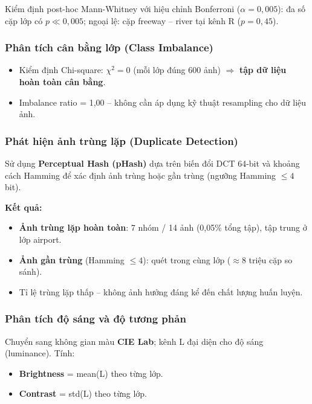 \documentclass[12pt,a4paper]{article}
\let\oldtextbf\textbf
\renewcommand{\textbf}[1]{\oldtextbf{\textcolor{hcmublue}{#1}}}
\begin{document}
Kiểm định post-hoc Mann-Whitney với hiệu chỉnh Bonferroni ($\alpha = 0{,}005$): đa số cặp lớp có $p \ll 0{,}005$; ngoại lệ: cặp freeway -- river tại kênh R ($p = 0{,}45$).

\subsubsection{Phân tích cân bằng lớp (Class Imbalance)}

\begin{itemize}
    \item Kiểm định Chi-square: $\chi^2 = 0$ (mỗi lớp đúng 600 ảnh) $\Rightarrow$ \textbf{tập dữ liệu hoàn toàn cân bằng}.
    \item Imbalance ratio = 1,00 -- không cần áp dụng kỹ thuật resampling cho dữ liệu ảnh.
\end{itemize}

\subsubsection{Phát hiện ảnh trùng lặp (Duplicate Detection)}

Sử dụng \textbf{Perceptual Hash (pHash)} dựa trên biến đổi DCT 64-bit và khoảng cách Hamming để xác định ảnh trùng hoặc gần trùng (ngưỡng Hamming $\leq 4$ bit).

\textbf{Kết quả:}
\begin{itemize}
    \item \textbf{Ảnh trùng lặp hoàn toàn}: 7 nhóm / 14 ảnh (0,05\% tổng tập), tập trung ở lớp airport.
    \item \textbf{Ảnh gần trùng} (Hamming $\leq 4$): quét trong cùng lớp ($\approx 8$ triệu cặp so sánh).
    \item Tỉ lệ trùng lặp thấp -- không ảnh hưởng đáng kể đến chất lượng huấn luyện.
\end{itemize}

\subsubsection{Phân tích độ sáng và độ tương phản}

Chuyển sang không gian màu \textbf{CIE Lab}; kênh L đại diện cho độ sáng (luminance). Tính:
\begin{itemize}
    \item \textbf{Brightness} = mean(L) theo từng lớp.
    \item \textbf{Contrast} = std(L) theo từng lớp.
\end{itemize}
\end{document}
